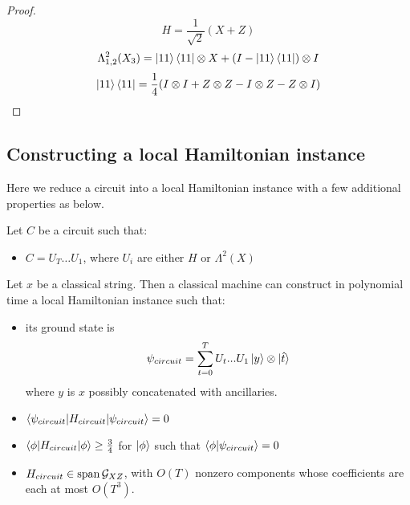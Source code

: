 \begin{proof}
	$$H=\frac{1}{\sqrt{2}}(X+Z)$$
	$$\Lambda^2_{1,2}(X_3)=\ket{11}\bra{11}\otimes X+(I-\ket{11}\bra{11})\otimes I$$
	$$\ket{11}\bra{11}=\frac{1}{4}(I\otimes I+Z\otimes Z-I\otimes Z-Z\otimes I)$$
\end{proof}

\subsection{Constructing a local Hamiltonian instance}

Here we reduce a circuit into a local Hamiltonian instance with a few additional properties as below.

\begin{theorem}
	Let $C$ be a circuit such that:
	\begin{itemize}
		\item $C=U_T\ldots U_1$, where $U_i$ are either $H$ or $\Lambda^2(X)$
	\end{itemize}
	Let $x$ be a classical string. Then a classical machine can construct in polynomial time a local Hamiltonian instance such that:
	\begin{itemize}
		\item its ground state is $$\psi_{circuit}=\sum_{t=0}^TU_t...U_1\ket{y}\otimes\ket{\hat{t}}$$ where $y$ is $x$ possibly concatenated with ancillaries.
		\item $\braket{\psi_{circuit}|H_{circuit}|\psi_{circuit}}=0$
		\item $\braket{\phi|H_{circuit}|\phi}\geq\frac{3}{4}$ for $\ket\phi$ such that $\braket{\phi|\psi_{circuit}}=0$
		\item $H_{circuit}\in\operatorname*{\operatorname{span}}\mathcal{G}_{XZ}$, with $O(T)$ nonzero components whose coefficients are each at most $O(T^3)$.
	\end{itemize}
\end{theorem}

